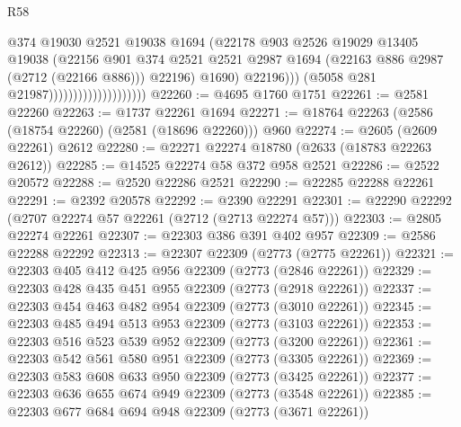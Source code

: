 \begin{lexlean}{R58}
\begin{coremodule}
                                                @374
                                                @19030
                                                @2521
                                                @19038
                                                @1694
                                                (@22178
                                                  @903
                                                  @2526
                                                  @19029
                                                  @13405
                                                  @19038
                                                  (@22156
                                                    @901
                                                    @374
                                                    @2521
                                                    @2521
                                                    @2987
                                                    @1694
                                                    (@22163 @886 @2987 (@2712 (@22166 @886)))
                                                    @22196)
                                                  @1690)
                                                @22196)))
                                          (@5058 @281 @21987))))))))))))))))))))
@22260 := @4695 @1760 @1751
@22261 := @2581 @22260
@22263 := @1737 @22261 @1694
@22271 := @18764 @22263 (@2586 (@18754 @22260) (@2581 (@18696 @22260))) @960
@22274 := @2605 (@2609 @22261) @2612
@22280 := @22271 @22274 @18780 (@2633 (@18783 @22263 @2612))
@22285 := @14525 @22274 @58 @372 @958 @2521
@22286 := @2522 @20572
@22288 := @2520 @22286 @2521
@22290 := @22285 @22288 @22261
@22291 := @2392 @20578
@22292 := @2390 @22291
@22301 := @22290 @22292 (@2707 @22274 @57 @22261 (@2712 (@2713 @22274 @57)))
@22303 := @2805 @22274 @22261
@22307 := @22303 @386 @391 @402 @957
@22309 := @2586 @22288 @22292
@22313 := @22307 @22309 (@2773 (@2775 @22261))
@22321 := @22303 @405 @412 @425 @956 @22309 (@2773 (@2846 @22261))
@22329 := @22303 @428 @435 @451 @955 @22309 (@2773 (@2918 @22261))
@22337 := @22303 @454 @463 @482 @954 @22309 (@2773 (@3010 @22261))
@22345 := @22303 @485 @494 @513 @953 @22309 (@2773 (@3103 @22261))
@22353 := @22303 @516 @523 @539 @952 @22309 (@2773 (@3200 @22261))
@22361 := @22303 @542 @561 @580 @951 @22309 (@2773 (@3305 @22261))
@22369 := @22303 @583 @608 @633 @950 @22309 (@2773 (@3425 @22261))
@22377 := @22303 @636 @655 @674 @949 @22309 (@2773 (@3548 @22261))
@22385 := @22303 @677 @684 @694 @948 @22309 (@2773 (@3671 @22261))

\end{coremodule}
\end{lexlean}
